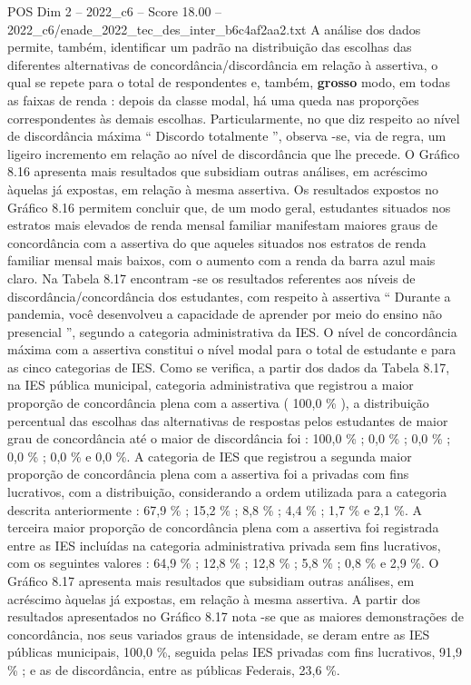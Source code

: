 \begin{textsample}{POS Dim 2 – 2022\_c6 – Score 18.00 – 2022\_c6/enade\_2022\_tec\_des\_inter\_b6c4af2aa2.txt}
A análise dos dados permite, também, identificar um padrão na distribuição das escolhas das diferentes alternativas de concordância/discordância em relação à assertiva, o qual se repete para o total de respondentes e, também, \textbf{grosso} modo, em todas as faixas de renda : depois da classe modal, há uma queda nas proporções correspondentes às demais escolhas.
Particularmente, no que diz respeito ao nível de discordância máxima “ Discordo totalmente ”, observa -se, via de regra, um ligeiro incremento em relação ao nível de discordância que lhe precede.
O Gráfico 8.16 apresenta mais resultados que subsidiam outras análises, em acréscimo àquelas já expostas, em relação à mesma assertiva.
Os resultados expostos no Gráfico 8.16 permitem concluir que, de um modo geral, estudantes situados nos estratos mais elevados de renda mensal familiar manifestam maiores graus de concordância com a assertiva do que aqueles situados nos estratos de renda familiar mensal mais baixos, com o aumento com a renda da barra azul mais claro.
Na Tabela 8.17 encontram -se os resultados referentes aos níveis de discordância/concordância dos estudantes, com respeito à assertiva “ Durante a pandemia, você desenvolveu a capacidade de aprender por meio do ensino não presencial ”, segundo a categoria administrativa da IES.
O nível de concordância máxima com a assertiva constitui o nível modal para o total de estudante e para as cinco categorias de IES.
Como se verifica, a partir dos dados da Tabela 8.17, na IES pública municipal, categoria administrativa que registrou a maior proporção de concordância plena com a assertiva ( 100,0 \% ), a distribuição percentual das escolhas das alternativas de respostas pelos estudantes de maior grau de concordância até o maior de discordância foi : 100,0 \% ; 0,0 \% ; 0,0 \% ; 0,0 \% ; 0,0 \% e 0,0 \%.
A categoria de IES que registrou a segunda maior proporção de concordância plena com a assertiva foi a privadas com fins lucrativos, com a distribuição, considerando a ordem utilizada para a categoria descrita anteriormente : 67,9 \% ; 15,2 \% ; 8,8 \% ; 4,4 \% ; 1,7 \% e 2,1 \%.
A terceira maior proporção de concordância plena com a assertiva foi registrada entre as IES incluídas na categoria administrativa privada sem fins lucrativos, com os seguintes valores : 64,9 \% ; 12,8 \% ; 12,8 \% ; 5,8 \% ; 0,8 \% e 2,9 \%.
O Gráfico 8.17 apresenta mais resultados que subsidiam outras análises, em acréscimo àquelas já expostas, em relação à mesma assertiva.
A partir dos resultados apresentados no Gráfico 8.17 nota -se que as maiores demonstrações de concordância, nos seus variados graus de intensidade, se deram entre as IES públicas municipais, 100,0 \%, seguida pelas IES privadas com fins lucrativos, 91,9 \% ; e as de discordância, entre as públicas Federais, 23,6 \%.

\end{textsample}
